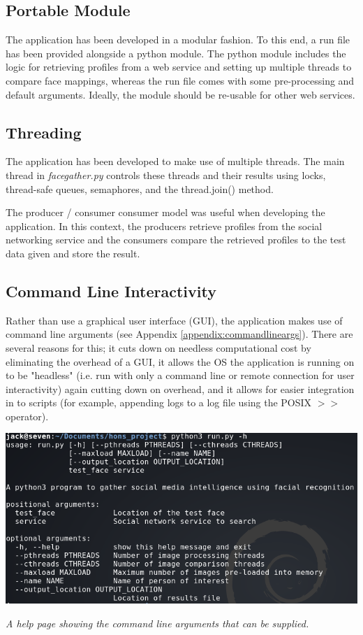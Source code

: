\documentclass[12pt]{article}
\begin{document}
\subsection{Portable Module}
The application has been developed in a modular fashion. To this end, a run file has been provided alongside a python module. The python module includes the logic for retrieving profiles from a web service and setting up multiple threads to compare face mappings, whereas the run file comes with some pre-processing and default arguments. Ideally, the module should be re-usable for other web services.

\subsection{Threading}
The application has been developed to make use of multiple threads. The main thread in \textit{facegather.py} controls these threads and their results using locks, thread-safe queues, semaphores, and the thread.join() method.

The producer / consumer consumer model was useful when developing the application. In this context, the producers retrieve profiles from the social networking service and the consumers compare the retrieved profiles to the test data given and store the result.

\subsection{Command Line Interactivity}
Rather than use a graphical user interface (GUI), the application makes use of command line arguments (see Appendix \ref{appendix:commandlineargs}). There are several reasons for this; it cuts down on needless computational cost by eliminating the overhead of a GUI, it allows the OS the application is running on to be "headless" (i.e. run with only a command line or remote connection for user interactivity) again cutting down on overhead, and it allows for easier integration in to scripts (for example, appending logs to a log file using the POSIX $>>$ operator).

\begin{center}
\includegraphics[width=\linewidth]{res/facegather_cmd_line_args.png}

\textit{A help page showing the command line arguments that can be supplied.}
\end{center}
\end{document}
